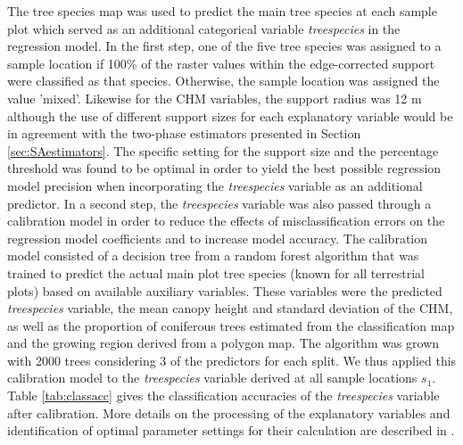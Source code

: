 The tree species map was used to predict the main tree species at each sample plot which served as an additional categorical variable \textit{treespecies} in the regression model. In the first step, one of the five tree species was assigned to a sample location if 100\% of the raster values within the edge-corrected support were classified as that species. Otherwise, the sample location was assigned the value 'mixed'. Likewise for the CHM variables, the support radius was 12 m although the use of different support sizes for each explanatory variable would be in agreement with the two-phase estimators presented in Section \ref{sec:SAestimators}. The specific setting for the support size and the percentage threshold was found to be optimal in order to yield the best possible regression model precision when incorporating the \textit{treespecies} variable as an additional predictor. In a second step, the \textit{treespecies} variable was also passed through a calibration model in order to reduce the effects of misclassification errors on the regression model coefficients and to increase model accuracy. The calibration model consisted of a decision tree from a random forest algorithm \citep{breiman2001} that was trained to predict the actual main plot tree species (known for all terrestrial plots) based on available auxiliary variables. These variables were the predicted \textit{treespecies} variable, the mean canopy height and standard deviation of the CHM, as well as the proportion of coniferous trees estimated from the classification map and the growing region derived from a polygon map. The algorithm was grown with 2000 trees considering 3 of the predictors for each split. We thus applied this calibration model to the \textit{treespecies} variable derived at all sample locations $s_1$. Table \ref{tab:classacc} gives the classification accuracies \citep{congalton2008} of the \textit{treespecies} variable after calibration. More details on the processing of the explanatory variables and identification of optimal parameter settings for their calculation are described in \citet{hill2017a}.


